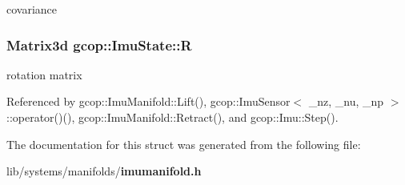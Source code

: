 covariance 

\subsubsection[{\-R}]{\setlength{\rightskip}{0pt plus 5cm}\-Matrix3d {\bf gcop\-::\-Imu\-State\-::\-R}}\label{structgcop_1_1ImuState_a4b099831f894b354386e0c687d3bb17f}


rotation matrix 



\-Referenced by gcop\-::\-Imu\-Manifold\-::\-Lift(), gcop\-::\-Imu\-Sensor$<$ \-\_\-nz, \-\_\-nu, \-\_\-np $>$\-::operator()(), gcop\-::\-Imu\-Manifold\-::\-Retract(), and gcop\-::\-Imu\-::\-Step().



\-The documentation for this struct was generated from the following file\-:\begin{DoxyCompactItemize}
\item 
lib/systems/manifolds/{\bf imumanifold.\-h}\end{DoxyCompactItemize}
